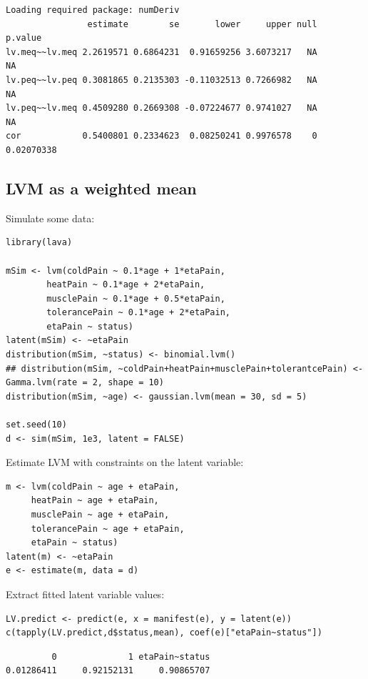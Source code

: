 \documentclass{article}
\begin{document}
\begin{verbatim}
Loading required package: numDeriv
                estimate        se       lower     upper null    p.value
lv.meq~~lv.meq 2.2619571 0.6864231  0.91659256 3.6073217   NA         NA
lv.peq~~lv.peq 0.3081865 0.2135303 -0.11032513 0.7266982   NA         NA
lv.peq~~lv.meq 0.4509280 0.2669308 -0.07224677 0.9741027   NA         NA
cor            0.5400801 0.2334623  0.08250241 0.9976578    0 0.02070338
\end{verbatim}

\subsection{LVM as a weighted mean}
\label{sec:orgeadf140}
Simulate some data:
\lstset{language=r,label= ,caption= ,captionpos=b,numbers=none}
\begin{lstlisting}
library(lava)

mSim <- lvm(coldPain ~ 0.1*age + 1*etaPain,
	    heatPain ~ 0.1*age + 2*etaPain,
	    musclePain ~ 0.1*age + 0.5*etaPain,
	    tolerancePain ~ 0.1*age + 2*etaPain,
	    etaPain ~ status)
latent(mSim) <- ~etaPain
distribution(mSim, ~status) <- binomial.lvm()
## distribution(mSim, ~coldPain+heatPain+musclePain+tolerantcePain) <- Gamma.lvm(rate = 2, shape = 10)
distribution(mSim, ~age) <- gaussian.lvm(mean = 30, sd = 5)

set.seed(10)
d <- sim(mSim, 1e3, latent = FALSE)
\end{lstlisting}

Estimate LVM with constraints on the latent variable:
\lstset{language=r,label= ,caption= ,captionpos=b,numbers=none}
\begin{lstlisting}
m <- lvm(coldPain ~ age + etaPain,
	 heatPain ~ age + etaPain,
	 musclePain ~ age + etaPain,
	 tolerancePain ~ age + etaPain,
	 etaPain ~ status)
latent(m) <- ~etaPain
e <- estimate(m, data = d)
\end{lstlisting}

Extract fitted latent variable values:
\lstset{language=r,label= ,caption= ,captionpos=b,numbers=none}
\begin{lstlisting}
LV.predict <- predict(e, x = manifest(e), y = latent(e))
c(tapply(LV.predict,d$status,mean), coef(e)["etaPain~status"])
\end{lstlisting}

\begin{verbatim}
         0              1 etaPain~status 
0.01286411     0.92152131     0.90865707
\end{verbatim}
\end{document}
